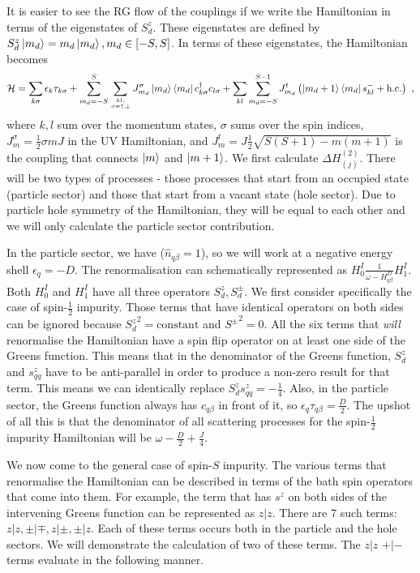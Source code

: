 \documentclass[10pt]{iopart}
\begin{document}
It is easier to see the RG flow of the couplings if we write the Hamiltonian in terms of the eigenstates of \(S_d^z\). These eigenstates are defined by \(S_d^z\ket{m_d} = m_d\ket{m_d}, m_d \in \left[-S, S\right]\). In terms of these eigenstates, the Hamiltonian becomes
\begin{eqnarray}
	\label{H_spin_S}
	\mathcal{H} = \sum_{k\sigma}\epsilon_{k}\tau_{k\sigma} + \sum_{m_d=-S}^S \sum_{kl,\atop{\sigma=\uparrow,\downarrow}} J^\sigma_{m_d} \ket{m_d}\bra{m_d} c^\dagger_{k \sigma}c_{l \sigma} + \sum_{kl} \sum_{m_d=-S}^{S-1} J^t_{m_d} \left(\ket{m_d+1}\bra{m_d} s^-_{kl}  + \text{h.c.}\right)~,
\end{eqnarray}
where \(k,l\) sum over the momentum states, \(\sigma\) sums over the spin indices, \(J^\sigma_m = \frac{1}{2} \sigma m J\) in the UV Hamiltonian, and \(J^t_{m} = J\frac{1}{2}\sqrt{S(S+1) - m(m+1)}\) is the coupling that connects \(\ket{m}\) and \(\ket{m+1}\). We first calculate \(\Delta H^{(2)}_{(j)}\). There will be two types of processes - those processes that start from an occupied state (particle sector) and those that start from a vacant state (hole sector). Due to particle hole symmetry of the Hamiltonian, they will be equal to each other and we will only calculate the particle sector contribution. 

In the particle sector, we have (\(\hat n_{q\beta}=1\)), so we will work at a negative energy  shell \(\epsilon_q = -D\). The renormalisation can schematically represented as \(H^I_0 \frac{1}{\omega - H^D_{q\beta}} H^I_1\). Both \(H^I_0\) and \(H^I_1\) have all three operators \(S_d^z, S_d^\pm\). We first consider specifically the case of spin-\(\frac{1}{2}\) impurity. Those terms that have identical operators on both sides can be ignored because \({S_d^z}^2 = \text{constant}\) and \({S^\pm}^2 = 0\). All the six terms that \textit{will} renormalise the Hamiltonian have a spin flip operator on at least one side of the Greens function. This means that in the denominator of the Greens function, \(S_d^z\) and \(s^z_{qq}\) have to be anti-parallel in order to produce a non-zero result for that term. This means we can identically replace \(S_d^z s^z_{qq} = -\frac{1}{4}\). Also, in the particle sector, the Greens function always has \(c_{q\beta}\) in front of it, so \(\epsilon_q \tau_{q\beta} = \frac{D}{2}\). The upshot of all this is that the denominator of all scattering processes for the spin-\(\frac{1}{2}\) impurity Hamiltonian will be \(\omega - \frac{D}{2} + \frac{J}{4}\).

We now come to the general case of spin-\(S\) impurity. The various terms that renormalise the Hamiltonian can be described in terms of the bath spin operators that come into them. For example, the term that has \(s^z\) on both sides of the intervening Greens function can be represented as \(z|z\). There are 7 such terms: \(z|z, \pm|\mp, z|\pm, \pm|z\). Each of these terms occurs both in the particle and the hole sectors. We will demonstrate the calculation of two of these terms. The \(z|z\) \(+|-\) terms evaluate in the following manner.
\end{document}
